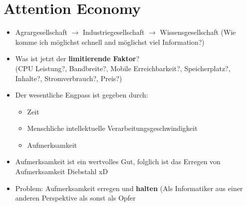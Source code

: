 \documentclass{article} %
\begin{document}
\section{Attention Economy}
	\begin{itemize}
		\item Agrargesellschaft $\rightarrow$ Industriegesellschaft $\rightarrow$ Wissensgesellschaft (Wie komme ich möglichst schnell and möglichst viel Information?)
		\item Was ist jetzt der \textbf{limitierende Faktor}?\\
		(CPU Leistung?, Bandbreite?, Mobile Erreichbarkeit?, Speicherplatz?, Inhalte?, Stromverbrauch?, Preis?)
		\item Der wesentliche Engpass ist gegeben durch:
		\begin{itemize}
			\item Zeit
			\item Menschliche intellektuelle Verarbeitungsgeschwindigkeit
			\item Aufmerksamkeit
		\end{itemize}
		\item Aufmerksamkeit ist ein wertvolles Gut, folglich ist das Erregen von Aufmerksamkeit Diebstahl xD
		\item Problem: Aufmerksamkeit erregen und \textbf{halten} (Als Informatiker aus einer anderen Perspektive als sonst als \glqq Opfer\grqq
	\end{itemize}
\end{document}
